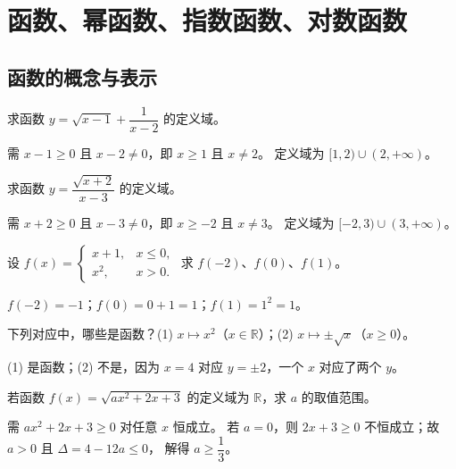 \chapter{函数、幂函数、指数函数、对数函数}

\section{函数的概念与表示}

\begin{problem}
求函数 $y=\sqrt{x-1}+\dfrac{1}{x-2}$ 的定义域。
\end{problem}
\begin{solution}
需 $x-1\geq0$ 且 $x-2\neq0$，即 $x\geq1$ 且 $x\neq2$。
定义域为 $[1,2)\cup(2,+\infty)$。
\end{solution}

\begin{problem}
求函数 $y=\dfrac{\sqrt{x+2}}{x-3}$ 的定义域。
\end{problem}
\begin{solution}
需 $x+2\geq0$ 且 $x-3\neq0$，即 $x\geq-2$ 且 $x\neq3$。
定义域为 $[-2,3)\cup(3,+\infty)$。
\end{solution}

\begin{problem}
设 $f(x)=\begin{cases}x+1,&x\leq0,\\ x^2,&x>0.\end{cases}$ 求 $f(-2)$、$f(0)$、$f(1)$。
\end{problem}
\begin{solution}
$f(-2)=-1$；$f(0)=0+1=1$；$f(1)=1^2=1$。
\end{solution}

\begin{problem}
下列对应中，哪些是函数？(1) $x\mapsto x^2$（$x\in\mathbb{R}$）；(2) $x\mapsto\pm\sqrt{x}$（$x\geq0$）。
\end{problem}
\begin{solution}
(1) 是函数；(2) 不是，因为 $x=4$ 对应 $y=\pm2$，一个 $x$ 对应了两个 $y$。
\end{solution}

\begin{problem}
若函数 $f(x)=\sqrt{ax^2+2x+3}$ 的定义域为 $\mathbb{R}$，求 $a$ 的取值范围。
\end{problem}
\begin{solution}
需 $ax^2+2x+3\geq0$ 对任意 $x$ 恒成立。
若 $a=0$，则 $2x+3\geq0$ 不恒成立；故 $a>0$ 且 $\Delta=4-12a\leq0$，
解得 $a\geq\dfrac13$。
\end{solution}

